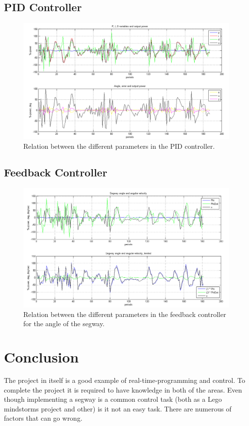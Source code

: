 \documentclass[a4paper]{article}
\begin{document}
\subsection{PID Controller}
\begin{figure}[H]
  \centering
\includegraphics[scale=0.47]{pic/pid.png}
\caption{Relation between the different parameters in the PID controller.}
\end{figure}

\subsection{Feedback Controller}
\begin{figure}[H]
  \centering
\includegraphics[scale=0.47]{pic/feedbackPlot.png}
\caption{Relation between the different parameters in the feedback controller for the angle of the segway.}
\end{figure}

\section{Conclusion}
The project in itself is a good example of real-time-programming and control. To complete the project it is required to have knowledge in both of the areas. Even though implementing a segway is a common control task (both as a Lego mindstorms project and other) is it not an easy task. There are numerous of factors that can go wrong.\\
\end{document}
